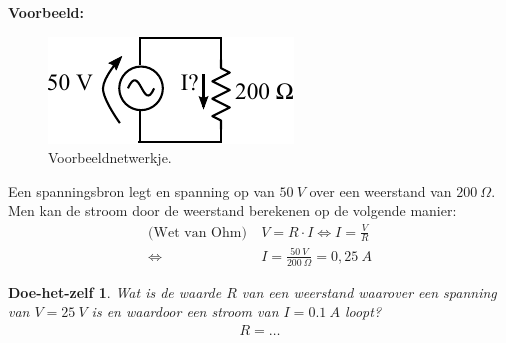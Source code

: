\documentclass{article}
\newtheorem{DIY}{Doe-het-zelf}
\begin{document}
			\textbf{Voorbeeld:}
			\begin{figure}[h!]
				\centering
				\includegraphics{vbweerstand.pdf}
				\caption{Voorbeeldnetwerkje.}
				\label{fig:vbweerstand}
			\end{figure}

			Een spanningsbron legt en spanning op van $50~V$ over een weerstand van $200~\Omega$. Men kan de stroom door de weerstand berekenen op de volgende manier:
			\begin{align*}
				\text{(Wet van Ohm)}~&V = R\cdot I \Leftrightarrow I = \frac{V}{R} \\ \Leftrightarrow~&I = \frac{50~V}{200~\Omega}= 0,25~A
			\end{align*}

			\begin{DIY} Wat is de waarde $R$ van een weerstand waarover een spanning van $V = 25~V$ is en waardoor een stroom van $I = 0.1~A$ loopt?
			\begin{align}
			    R = \ldots
			\end{align}
			\end{DIY}
\end{document}
